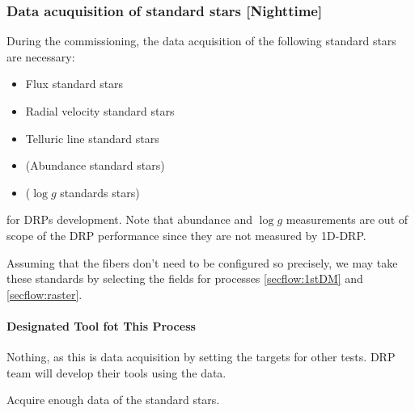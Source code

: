 \subsubsection{Data acuquisition of standard stars [Nighttime]}\label{secflow:StdStar}


During the commissioning, the data acquisition of the following standard stars are necessary:
\begin{itemize}
    \item Flux standard stars
    \item Radial velocity standard stars
    \item Telluric line standard stars
    \item (Abundance standard stars)
    \item ($\log g$ standards stars)
\end{itemize}
for DRPs development.
Note that abundance and $\log g$ measurements are out of scope of the DRP performance since they are not measured by 1D-DRP.

Assuming that the fibers don't need to be configured so precisely, we may take these standards by selecting the fields for processes \ref{secflow:1stDM} and \ref{secflow:raster}.

\paragraph{Designated Tool fot This Process}
Nothing, as this is data acquisition by setting the targets for other tests.
DRP team will develop their tools using the data.

\begin{itembox}[l]{}
Acquire enough data of the standard stars.

\end{itembox}